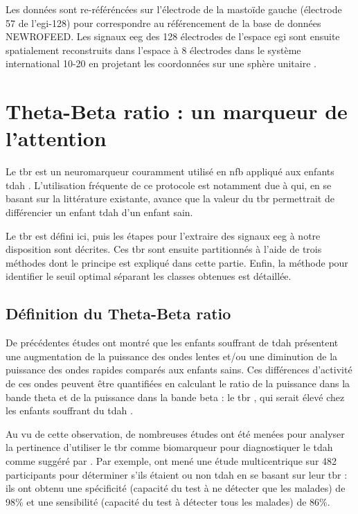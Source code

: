 Les données sont re-référéncées sur l'électrode de la mastoïde gauche (électrode 57 de l'\gls{egi}-128) pour correspondre au référencement de la base
de données NEWROFEED. Les signaux \gls{eeg} des 128 électrodes de l'espace \gls{egi} sont ensuite spatialement reconstruits dans l'espace à 8 électrodes 
dans le système international 10-20 en projetant les coordonnées sur une sphère unitaire \citep{Perrin1989}.


\section{Theta-Beta ratio : un marqueur de l'attention}

Le \gls{tbr} est un neuromarqueur couramment utilisé en \gls{nfb} appliqué aux enfants \gls{tdah} \citep{Arns2013}. L'utilisation fréquente de ce protocole est notamment due
à \citet{Lubar1991} qui, en se basant sur la littérature existante, avance que la valeur du \gls{tbr} permettrait de différencier un enfant \gls{tdah} d'un enfant sain.  

Le \gls{tbr} est défini ici, puis les étapes pour l'extraire des
signaux \gls{eeg} à notre disposition sont décrites. Ces \gls{tbr} sont ensuite partitionnés à l'aide de trois méthodes dont le principe est expliqué dans cette partie. 
Enfin, la méthode pour identifier le seuil optimal séparant les classes obtenues est détaillée.

\subsection{Définition du Theta-Beta ratio}
De précédentes études ont montré que les enfants souffrant de \gls{tdah} présentent une augmentation
de la puissance des ondes lentes et/ou une diminution de la puissance des ondes rapides
comparés aux enfants sains. Ces différences d'activité de ces 
ondes peuvent être quantifiées en calculant le ratio de la puissance dans la bande theta et de la puissance dans la bande beta : le 
\gls{tbr} \citep{Arns2013}, qui serait élevé chez les enfants souffrant du \gls{tdah} \citep{Lubar1991, Monastra1999, Barry2009, Snyder2006}. 

Au vu de cette observation, de nombreuses études ont été menées pour analyser la pertinence d'utiliser le \gls{tbr} comme biomarqueur pour 
diagnostiquer le \gls{tdah} comme suggéré par \citet{Lubar1991}. 
Par exemple, \citet{Monastra1999} ont mené une étude multicentrique sur 482 participants pour déterminer s'ils étaient ou non \gls{tdah} en se basant sur leur \gls{tbr} : 
ils ont obtenu une spécificité (capacité du test à ne détecter que les malades) de 98\% et une sensibilité (capacité du test à détecter tous les malades) de 86\%. 


